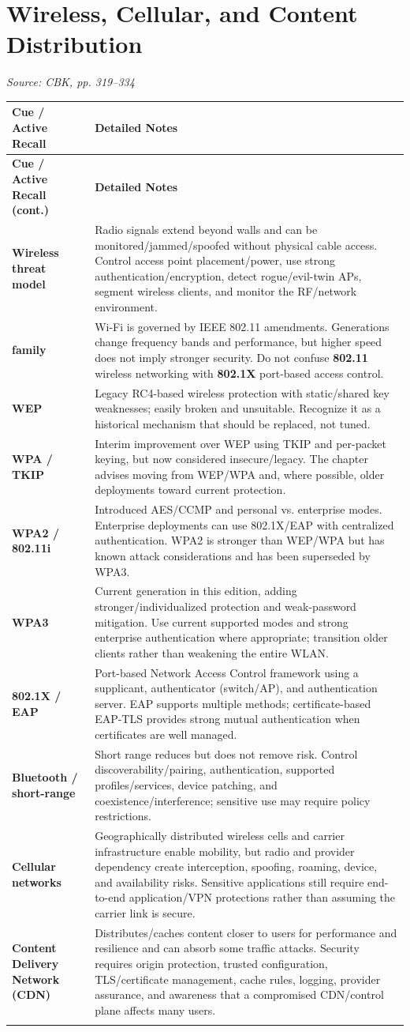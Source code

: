 \documentclass[10pt,letterpaper]{article}
\makeatletter
\newenvironment{cornell}{\rowcolors{2}{white}{notebg}\begin{longtable}{@{}>{\raggedright\arraybackslash\columncolor{cuebg}\color{navy}\bfseries}p{0.285\textwidth}>{\raggedright\arraybackslash}p{0.65\textwidth}@{}}\rowcolor{navy}\color{white}\textbf{Cue / Active Recall} & \color{white}\textbf{Detailed Notes}\\ \hline\endfirsthead\rowcolor{navy}\color{white}\textbf{Cue / Active Recall (cont.)} & \color{white}\textbf{Detailed Notes}\\ \hline\endhead}{\end{longtable}}
\newcommand{\noterow}[2]{#1 & #2\\\arrayrulecolor{line}\hline}\newcommand{\source}[1]{\par{\footnotesize\color{teal}\textit{Source: CBK, #1}}\par}
\makeatother
\begin{document}
\section{\color{navy}Wireless, Cellular, and Content Distribution}
\source{pp. 319--334}
\begin{cornell}
\noterow{Wireless threat model}{Radio signals extend beyond walls and can be monitored/jammed/spoofed without physical cable access. Control access point placement/power, use strong authentication/encryption, detect rogue/evil-twin APs, segment wireless clients, and monitor the RF/network environment.}
\noterow{802.11 family}{Wi-Fi is governed by IEEE 802.11 amendments. Generations change frequency bands and performance, but higher speed does not imply stronger security. Do not confuse \textbf{802.11} wireless networking with \textbf{802.1X} port-based access control.}
\noterow{WEP}{Legacy RC4-based wireless protection with static/shared key weaknesses; easily broken and unsuitable. Recognize it as a historical mechanism that should be replaced, not tuned.}
\noterow{WPA / TKIP}{Interim improvement over WEP using TKIP and per-packet keying, but now considered insecure/legacy. The chapter advises moving from WEP/WPA and, where possible, older deployments toward current protection.}
\noterow{WPA2 / 802.11i}{Introduced AES/CCMP and personal vs. enterprise modes. Enterprise deployments can use 802.1X/EAP with centralized authentication. WPA2 is stronger than WEP/WPA but has known attack considerations and has been superseded by WPA3.}
\noterow{WPA3}{Current generation in this edition, adding stronger/individualized protection and weak-password mitigation. Use current supported modes and strong enterprise authentication where appropriate; transition older clients rather than weakening the entire WLAN.}
\noterow{802.1X / EAP}{Port-based Network Access Control framework using a supplicant, authenticator (switch/AP), and authentication server. EAP supports multiple methods; certificate-based EAP-TLS provides strong mutual authentication when certificates are well managed.}
\noterow{Bluetooth / short-range}{Short range reduces but does not remove risk. Control discoverability/pairing, authentication, supported profiles/services, device patching, and coexistence/interference; sensitive use may require policy restrictions.}
\noterow{Cellular networks}{Geographically distributed wireless cells and carrier infrastructure enable mobility, but radio and provider dependency create interception, spoofing, roaming, device, and availability risks. Sensitive applications still require end-to-end application/VPN protections rather than assuming the carrier link is secure.}
\noterow{Content Delivery Network (CDN)}{Distributes/caches content closer to users for performance and resilience and can absorb some traffic attacks. Security requires origin protection, trusted configuration, TLS/certificate management, cache rules, logging, provider assurance, and awareness that a compromised CDN/control plane affects many users.}
\end{cornell}
\end{document}
